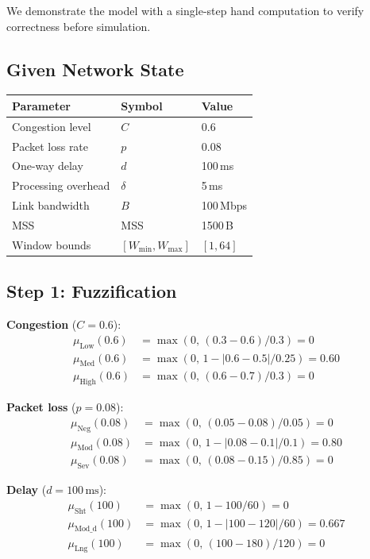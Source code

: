 \documentclass[10pt, twocolumn]{IEEEtran}
\theoremstyle{definition}
\begin{document}
We demonstrate the model with a single-step hand computation to verify correctness before simulation.

\subsection{Given Network State}

\begin{center}
\small
\begin{tabular}{lll}
\toprule
Parameter & Symbol & Value \\
\midrule
Congestion level    & $C$        & 0.6 \\
Packet loss rate    & $p$        & 0.08 \\
One-way delay       & $d$        & 100\,ms \\
Processing overhead & $\delta$   & 5\,ms \\
Link bandwidth      & $B$        & 100\,Mbps \\
MSS                 & MSS        & 1500\,B \\
Window bounds       & $[W_{\min}, W_{\max}]$ & $[1, 64]$ \\
\bottomrule
\end{tabular}
\end{center}

\subsection{Step 1: Fuzzification}

\textbf{Congestion} ($C = 0.6$):
\begin{align*}
  \mu_{\text{Low}}(0.6) &= \max(0,\, (0.3-0.6)/0.3) = 0\\
  \mu_{\text{Med}}(0.6) &= \max(0,\, 1 - |0.6-0.5|/0.25) = 0.60\\
  \mu_{\text{High}}(0.6) &= \max(0,\, (0.6-0.7)/0.3) = 0
\end{align*}

\textbf{Packet loss} ($p = 0.08$):
\begin{align*}
  \mu_{\text{Neg}}(0.08) &= \max(0,\,(0.05-0.08)/0.05) = 0\\
  \mu_{\text{Mod}}(0.08) &= \max(0,\, 1-|0.08-0.1|/0.1) = 0.80\\
  \mu_{\text{Sev}}(0.08) &= \max(0,\,(0.08-0.15)/0.85) = 0
\end{align*}

\textbf{Delay} ($d = 100\,\text{ms}$):
\begin{align*}
  \mu_{\text{Sht}}(100) &= \max(0,\, 1-100/60) = 0\\
  \mu_{\text{Mod\_d}}(100) &= \max(0,\, 1-|100-120|/60) = 0.667\\
  \mu_{\text{Lng}}(100) &= \max(0,\, (100-180)/120) = 0
\end{align*}
\end{document}
